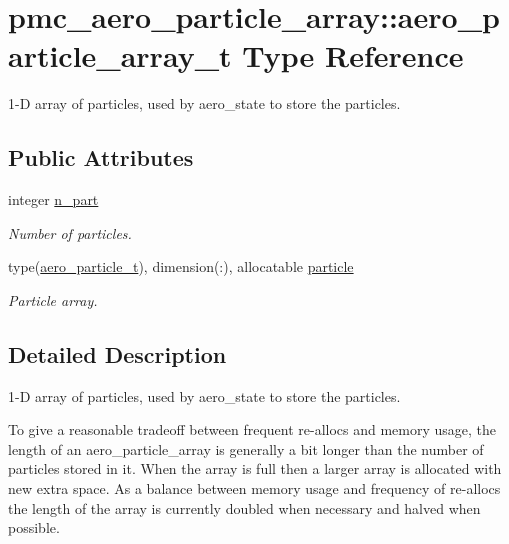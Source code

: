 \hypertarget{structpmc__aero__particle__array_1_1aero__particle__array__t}{}\section{pmc\+\_\+aero\+\_\+particle\+\_\+array\+:\+:aero\+\_\+particle\+\_\+array\+\_\+t Type Reference}
\label{structpmc__aero__particle__array_1_1aero__particle__array__t}


1-\/D array of particles, used by aero\+\_\+state to store the particles.  


\subsection*{Public Attributes}
\begin{DoxyCompactItemize}
\item 
integer \mbox{\hyperlink{structpmc__aero__particle__array_1_1aero__particle__array__t_abea078a0a82f57ecedc6c0072241c69d}{n\+\_\+part}}
\begin{DoxyCompactList}\small\item\em Number of particles. \end{DoxyCompactList}\item 
type(\mbox{\hyperlink{structpmc__aero__particle_1_1aero__particle__t}{aero\+\_\+particle\+\_\+t}}), dimension(\+:), allocatable \mbox{\hyperlink{structpmc__aero__particle__array_1_1aero__particle__array__t_adf475eb5715837eac48c805e42ead230}{particle}}
\begin{DoxyCompactList}\small\item\em Particle array. \end{DoxyCompactList}\end{DoxyCompactItemize}


\subsection{Detailed Description}
1-\/D array of particles, used by aero\+\_\+state to store the particles. 

To give a reasonable tradeoff between frequent re-\/allocs and memory usage, the length of an aero\+\_\+particle\+\_\+array is generally a bit longer than the number of particles stored in it. When the array is full then a larger array is allocated with new extra space. As a balance between memory usage and frequency of re-\/allocs the length of the array is currently doubled when necessary and halved when possible.

